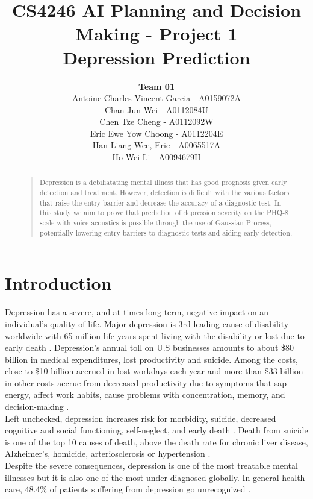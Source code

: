 \documentclass{article}
\title{
	CS4246 AI Planning and Decision Making - Project 1 \\
	Depression Prediction
}
\author{
	{\bf Team 01} \\
	Antoine Charles Vincent Garcia - A0159072A\\
	Chan Jun Wei - A0112084U\\
	Chen Tze Cheng - A0112092W\\
	Eric Ewe Yow Choong - A0112204E\\
	Han Liang Wee, Eric - A0065517A\\
	Ho Wei Li - A0094679H\\
}
\begin{document}
 	\maketitle

	\begin{abstract}
	\begin{quote}
	Depression is a debiliatating mental illness that has good prognosis given early detection and treatment. 
	However, detection is difficult with the various factors that raise the entry barrier and decrease the accuracy of a diagnostic test. 
	In this study we aim to prove that prediction of depression severity on the PHQ-8 scale with voice acoustics is possible through the use of Gaussian Process, potentially lowering entry barriers to diagnostic tests and aiding early detection.
	\end{quote}
	\end{abstract}
	
	\section{Introduction}
	Depression has a severe, and at times long-term, negative impact on an individual's quality of life. 
	Major depression is 3rd leading cause of disability worldwide with 65 million life years spent living with the disability or lost due to early death \cite{who2004}.
	Depression's annual toll on U.S businesses amounts to about \$80 billion in medical expenditures, lost productivity and suicide. 
	Among the costs, close to \$10 billion accrued in lost workdays each year and more than \$33 billion in other costs accrue from decreased productivity due to symptoms that sap energy, affect work habits, cause problems with concentration, memory, and decision-making \cite{tjcp2015}. \\

	Left unchecked, depression increases risk for morbidity, suicide, decreased cognitive and social functioning, self-neglect, and early death \cite{arcp2009}. 
	Death from suicide is one of the top 10 causes of death, above the death rate for chronic liver disease, Alzheimer's, homicide, arteriosclerosis or hypertension \cite{nvsr2016}. \\

	Despite the severe consequences, depression is one of the most treatable mental illnesses but it is also one of the most under-diagnosed globally. 
	In general health-care, 48.4\% of patients suffering from depression go unrecognized \cite{jama2003}.
\end{document}
